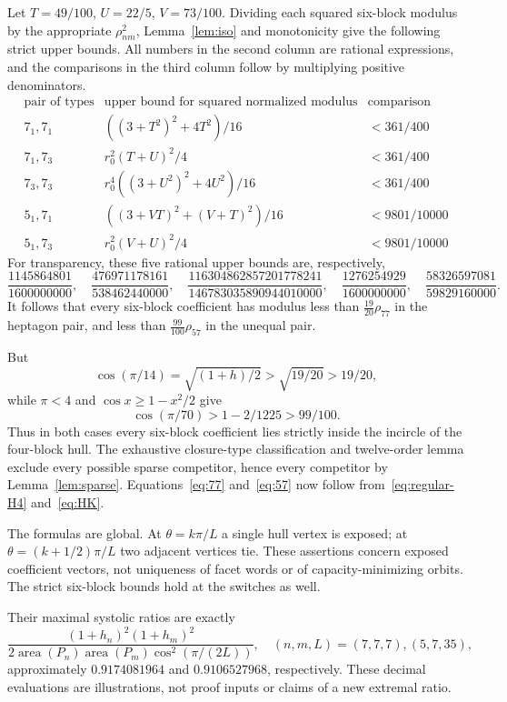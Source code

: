 \documentclass[11pt,a4paper]{article}
\theoremstyle{definition}\newtheorem{definition}[theorem]{Definition}
\theoremstyle{remark}\newtheorem{remark}[theorem]{Remark}
\newcommand{\area}{\operatorname{area}}
\begin{document}
Let $T=49/100$, $U=22/5$, $V=73/100$. Dividing each squared six-block modulus by the appropriate $\rho_{nm}^2$, Lemma~\ref{lem:iso} and monotonicity give the following strict upper bounds. All numbers in the second column are rational expressions, and the comparisons in the third column follow by multiplying positive denominators.
\[
\begin{array}{c|c|c}
\text{pair of types}&\text{upper bound for squared normalized modulus}&\text{comparison}\\\hline
7_1,7_1&((3+T^2)^2+4T^2)/16&<361/400\\
7_1,7_3&r_0^2(T+U)^2/4&<361/400\\
7_3,7_3&r_0^4((3+U^2)^2+4U^2)/16&<361/400\\\hline
5_1,7_1&((3+VT)^2+(V+T)^2)/16&<9801/10000\\
5_1,7_3&r_0^2(V+U)^2/4&<9801/10000
\end{array}
\]
For transparency, these five rational upper bounds are, respectively,
\[
 \frac{1145864801}{1600000000},\quad
 \frac{476971178161}{538462440000},\quad
 \frac{116304862857201778241}{146783035890944010000},\quad
 \frac{1276254929}{1600000000},\quad
 \frac{58326597081}{59829160000}.
\]
It follows that every six-block coefficient has modulus less than $\frac{19}{20}\rho_{77}$ in the heptagon pair, and less than $\frac{99}{100}\rho_{57}$ in the unequal pair.

But
\[
 \cos(\pi/14)=\sqrt{(1+h)/2}>\sqrt{19/20}>19/20,
\]
while $\pi<4$ and $\cos x\ge1-x^2/2$ give
\[
 \cos(\pi/70)>1-2/1225>99/100.
\]
Thus in both cases every six-block coefficient lies strictly inside the incircle of the four-block hull. The exhaustive closure-type classification and twelve-order lemma exclude every possible sparse competitor, hence every competitor by Lemma~\ref{lem:sparse}. Equations~\eqref{eq:77} and~\eqref{eq:57} now follow from~\eqref{eq:regular-H4} and~\eqref{eq:HK}.

The formulas are global. At $\theta=k\pi/L$ a single hull vertex is exposed; at $\theta=(k+1/2)\pi/L$ two adjacent vertices tie. These assertions concern exposed coefficient vectors, not uniqueness of facet words or of capacity-minimizing orbits. The strict six-block bounds hold at the switches as well.

Their maximal systolic ratios are exactly
\[
 \frac{(1+h_n)^2(1+h_m)^2}
 {2\area(P_n)\area(P_m)\cos^2(\pi/(2L))},
 \quad (n,m,L)=(7,7,7),(5,7,35),
\]
approximately $0.9174081964$ and $0.9106527968$, respectively. These decimal evaluations are illustrations, not proof inputs or claims of a new extremal ratio.
\end{document}

